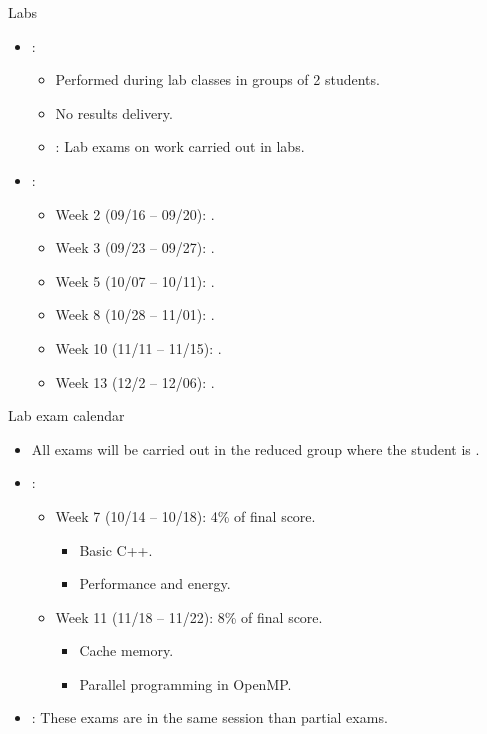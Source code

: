 \begin{frame}[t]{Labs}
\begin{itemize}
  \item {}:
    \begin{itemize}
        \item Performed during lab classes in groups of 2 students.
        \item No results delivery.
        \item {}: Lab exams on work carried out in labs.
    \end{itemize}

  \item {}:
    \begin{itemize}
      \item Week 2 (09/16 -- 09/20): .
      \item Week 3 (09/23 -- 09/27): .
      \item Week 5 (10/07 -- 10/11): .
      \item Week 8 (10/28 -- 11/01): .
      \item Week 10 (11/11 -- 11/15): .
      \item Week 13 (12/2 -- 12/06): .
    \end{itemize}
\end{itemize}
\end{frame}

\begin{frame}[t]{Lab exam calendar}
\begin{itemize}
  \item All exams will be carried out in the reduced group
        where the student is .

  \vfill
  \item {}:
  \begin{itemize}
    \item Week 7 (10/14 -- 10/18): 4\% of final score.
      \begin{itemize}
        \item Basic C++.
        \item Performance and energy.
      \end{itemize}
    \item Week 11 (11/18 -- 11/22): 8\% of final score.
      \begin{itemize}
        \item Cache memory.
        \item Parallel programming in OpenMP.
      \end{itemize}
  \end{itemize}

  \item {}: These exams are in the same session
        than partial exams.
\end{itemize}
\end{frame}


